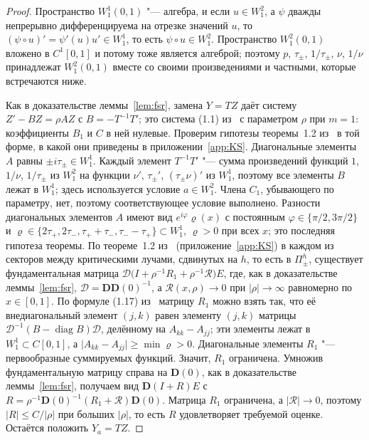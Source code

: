 \documentclass[12pt,a4paper]{article}
\numberwithin{equation}{section}
\theoremstyle{definition}
\newcommand{\abs}[1]{\lvert#1\rvert}
\newcommand{\Dd}{\mathbf D}
\begin{document}
\begin{proof}
Пространство $W^1_1(0,1)$ "--- алгебра, и если $u\in W^2_1$, а $\psi$ дважды непрерывно
дифференцируема на отрезке значений $u$, то $(\psi\circ u)'=\psi'(u)u'\in W^1_1$, то есть
$\psi\circ u\in W^2_1$. Пространство $W^2_1(0,1)$ вложено в $C^1[0,1]$ и потому тоже является
алгеброй; поэтому $p$, $\tau_\pm$, $1/\tau_\pm$, $\nu$, $1/\nu$ принадлежат $W^2_1(0,1)$ вместе со
своими произведениями и частными, которые встречаются ниже.

Как в доказательстве леммы~\ref{lem:fsr}, замена $Y=TZ$ даёт систему $Z'-BZ=\rho AZ$ с
$B=-T^{-1}T'$; это система (1.1) из~\cite{KS2} с параметром $\rho$ при $m=1$: коэффициенты $B_1$ и
$C$ в ней нулевые. Проверим гипотезы теоремы~1.2 из~\cite{KS2} в той форме, в какой они приведены
в приложении~\ref{app:KS}. Диагональные элементы $A$ равны $\pm i\tau_\pm\in W^1_1$. Каждый элемент
$T^{-1}T'$ "--- сумма
произведений функций $1$, $1/\nu$, $1/\tau_\pm$ из $W^2_1$ на функции $\nu'$, $\tau_\pm'$,
$(\tau_\pm\nu)'$ из $W^1_1$, поэтому все элементы $B$ лежат в $W^1_1$; здесь используется условие
$a\in W^2_1$. Члена $C_1$, убывающего по параметру, нет, поэтому соответствующее условие выполнено.
Разности диагональных элементов $A$ имеют вид $e^{i\varphi}\varrho(x)$ с постоянным
$\varphi\in\{\pi/2,3\pi/2\}$ и $\varrho\in\{2\tau_+,2\tau_-,\tau_++\tau_-,\tau_--\tau_+\}\subset W^1_1$,
$\varrho>0$ при всех $x$; это последняя гипотеза теоремы. По теореме~1.2 из~\cite{KS2}
(приложение~\ref{app:KS}) в
каждом из секторов между критическими лучами, сдвинутых на $h$, то есть в $\Pi_\pm^h$, существует
фундаментальная матрица $\mathcal D\bigl(I+\rho^{-1}R_1+\rho^{-1}\mathcal R\bigr)E$, где, как в
доказательстве леммы~\ref{lem:fsr}, $\mathcal D=\Dd\Dd(0)^{-1}$, а
$\mathcal R(x,\rho)\to0$ при $\abs\rho\to\infty$ равномерно по $x\in[0,1]$. По формуле (1.17)
из~\cite{KS2} матрицу $R_1$ можно взять так, что её внедиагональный элемент $(j,k)$ равен
элементу $(j,k)$ матрицы $\mathcal D^{-1}(B-\operatorname{diag}B)\mathcal D$, делённому на
$A_{kk}-A_{jj}$; эти элементы лежат в $W^1_1\subset C[0,1]$, а
$\abs{A_{kk}-A_{jj}}\ge\min\varrho>0$. Диагональные элементы $R_1$ "--- первообразные суммируемых
функций. Значит, $R_1$ ограничена. Умножив фундаментальную матрицу справа на $\Dd(0)$, как в
доказательстве леммы~\ref{lem:fsr}, получаем вид $\Dd(I+R)E$ с
$R=\rho^{-1}\Dd(0)^{-1}(R_1+\mathcal R)\Dd(0)$. Матрица $R_1$ ограничена, а
$\abs{\mathcal R}\to0$, поэтому $\abs R\le C/\abs\rho$ при больших $\abs\rho$, то есть $R$
удовлетворяет требуемой оценке. Остаётся
положить $Y_a=TZ$.
\end{proof}
\end{document}
